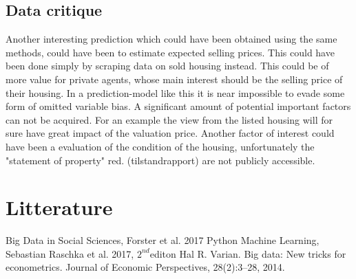 \documentclass[12pt,a4paper]{article}
\begin{document}
\subsection{Data critique}
Another interesting prediction which could have been obtained using the same methods, could have been to estimate expected selling prices. This could have been done simply by scraping data on sold housing instead. This could be of more value for private agents, whose main interest should be the selling price of their housing. 
\newline 
In a prediction-model like this it is near impossible to evade some form of omitted variable bias. A significant amount of potential important factors can not be acquired. For an example the view from the listed housing will for sure have great impact of the valuation price. Another factor of interest could have been a evaluation of the condition of the housing, unfortunately the "statement of property" red. (tilstandrapport) are not publicly accessible.

\newpage
\section{Litterature}

Big Data in Social Sciences, Forster et al. 2017
\newline Python Machine Learning, Sebastian Raschka et al. 2017, $2^{nd}$editon
\newline Hal R. Varian. Big data: New tricks for econometrics. Journal of Economic Perspectives, 28(2):3–28, 2014.
\end{document}
